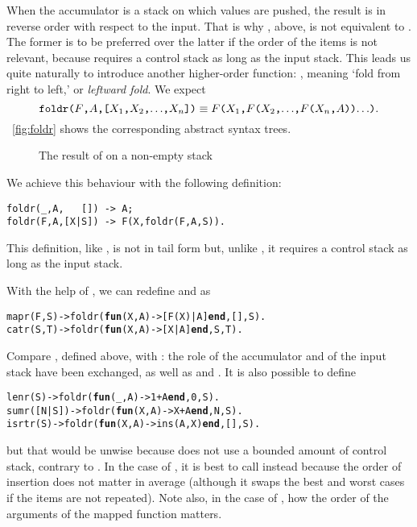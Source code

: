 When the accumulator is a stack on which values are pushed, the result
is in reverse order with respect to the input. That is why
, above, is not equivalent to . The
former is to be preferred over the latter if the order of the items is
not relevant, because  requires a control stack as long
as the input stack. This leads us quite naturally to introduce another
higher\hyp{}order function: , meaning `fold from
right to left,' or \emph{leftward fold}. We expect
\begin{equation*}
\texttt{foldr(\(F\),\(A\),[\(X_1\),\(X_2\),\(\ldots\),\(X_{n}\)])}
\equiv
\texttt{\(F\)(\(X_1\),\(F\)(\(X_2\),\(\ldots\),\(F\)(\(X_{n}\),\(A\)))\(\ldots\))}.
\end{equation*}
\Fig~\vref{fig:foldr} shows the corresponding abstract syntax trees.
\begin{figure}[b]
\centering
{}
\qquad
{}
\caption{The result of  on a non\hyp{}empty stack}
\label{fig:foldr}
\end{figure}
We achieve this behaviour with the following definition:
\begin{verbatim}
foldr(_,A,   []) -> A;
foldr(F,A,[X|S]) -> F(X,foldr(F,A,S)).
\end{verbatim}
This definition, like , is not in tail form but,
unlike , it requires a control stack as long as the
input stack.

With the help of , we can redefine 
and  as
\begin{alltt}
mapr(F,S) -> foldr(\textbf{fun}(X,A) -> [F(X)|A] \textbf{end},[],S).
catr(S,T) -> foldr(\textbf{fun}(X,A) ->    [X|A] \textbf{end}, S,T).
\end{alltt}
Compare , defined above, with : the
role of the accumulator and of the input stack have been exchanged, as
well as  and . It is also possible
to define
\begin{alltt}
lenr(S)     -> foldr(\textbf{fun}(\_,A) -> 1+A \textbf{end}, 0,S).\hfill% \emph{Bad}
sumr([N|S]) -> foldr(\textbf{fun}(X,A) -> X+A \textbf{end}, N,S).\hfill% \emph{Bad}
isrtr(S)    -> foldr(\textbf{fun}(X,A) -> ins(A,X) \textbf{end},[],S).\hfill% \emph{Bad}
\end{alltt}
but that would be unwise because  does not use a
bounded amount of control stack, contrary to . In the
case of , it is best to call  instead
because the order of insertion does not matter in average (although it
swaps the best and worst cases if the items are not repeated). Note
also, in the case of , how the order of the arguments
of the mapped function  matters.


